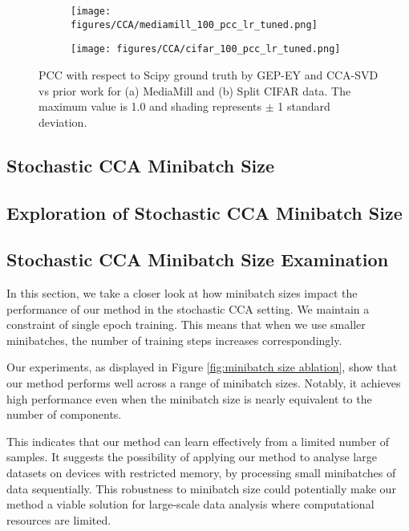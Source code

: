 \begin{figure}%
     \centering
     \begin{subfigure}[b]{0.49\textwidth}
         \centering
         \texttt{[image: figures/CCA/mediamill\_100\_pcc\_lr\_tuned.png]}
         \label{fig:ccamediamill}
     \end{subfigure}
     \hfill
     \begin{subfigure}[b]{0.49\textwidth}
         \centering
         \texttt{[image: figures/CCA/cifar\_100\_pcc\_lr\_tuned.png]}
         \label{fig:ccacifar}
     \end{subfigure}
        \caption{PCC with respect to Scipy ground truth by GEP-EY and CCA-SVD vs prior work for (a) MediaMill and (b) Split CIFAR data. The maximum value is 1.0 and shading represents $\pm$ 1 standard deviation.}
        \label{fig:ccaiter}
    \label{fig: stochasticcca}
\end{figure}

\subsection{Stochastic CCA Minibatch Size}

\subsection{Exploration of Stochastic CCA Minibatch Size}

\subsection{Stochastic CCA Minibatch Size Examination}

In this section, we take a closer look at how minibatch sizes impact the performance of our method in the stochastic CCA setting. We maintain a constraint of single epoch training. This means that when we use smaller minibatches, the number of training steps increases correspondingly. 

Our experiments, as displayed in Figure \ref{fig:minibatch size ablation}, show that our method performs well across a range of minibatch sizes. Notably, it achieves high performance even when the minibatch size is nearly equivalent to the number of components. 

This indicates that our method can learn effectively from a limited number of samples. It suggests the possibility of applying our method to analyse large datasets on devices with restricted memory, by processing small minibatches of data sequentially. This robustness to minibatch size could potentially make our method a viable solution for large-scale data analysis where computational resources are limited.

